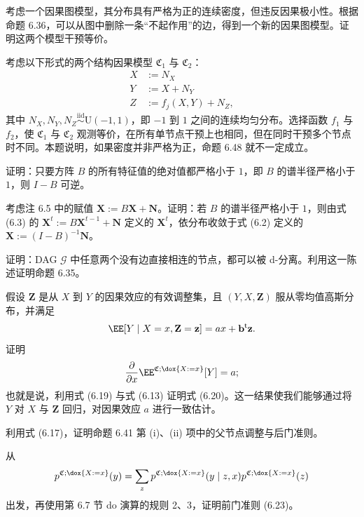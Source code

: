 \begin{problem}[因果极小性]
考虑一个因果图模型，其分布具有严格为正的连续密度，但违反因果极小性。根据命题 6.36，可以从图中删除一条“不起作用”的边，得到一个新的因果图模型。证明这两个模型干预等价。
\end{problem}

\begin{problem}[干预等价性]
考虑以下形式的两个结构因果模型 $\mathfrak C_1$ 与 $\mathfrak C_2$：
\[
 \begin{aligned}
 X&:=N_X\\
 Y&:=X+N_Y\\
 Z&:=f_j(X,Y)+N_Z,
 \end{aligned}
\]
其中 $N_X,N_Y,N_Z\overset{\mathrm{iid}}{\sim}\mathrm U(-1,1)$，即 $-1$ 到 $1$ 之间的连续均匀分布。选择函数 $f_1$ 与 $f_2$，使 $\mathfrak C_1$ 与 $\mathfrak C_2$ 观测等价，在所有单节点干预上也相同，但在同时干预多个节点时不同。本题说明，如果密度并非严格为正，命题 6.48 就不一定成立。
\end{problem}

\begin{problem}[有环结构因果模型]
证明：只要方阵 $B$ 的所有特征值的绝对值都严格小于 $1$，即 $B$ 的谱半径严格小于 $1$，则 $I-B$ 可逆。
\end{problem}

\begin{problem}[有环结构因果模型]
考虑注 6.5 中的赋值 $\mathbf X:=B\mathbf X+\mathbf N$。证明：若 $B$ 的谱半径严格小于 $1$，则由式 (6.3) 的 $\mathbf X^t:=B\mathbf X^{t-1}+\mathbf N$ 定义的 $\mathbf X^t$，依分布收敛于式 (6.2) 定义的 $\mathbf X:=(I-B)^{-1}\mathbf N$。
\end{problem}

\begin{problem}[d-分离]
证明：DAG $\mathcal G$ 中任意两个没有边直接相连的节点，都可以被 d-分离。利用这一陈述证明命题 6.35。
\end{problem}

\begin{problem}[协变量调整]
假设 $\mathbf Z$ 是从 $X$ 到 $Y$ 的因果效应的有效调整集，且 $(Y,X,\mathbf Z)$ 服从零均值高斯分布，并满足
\[
 \EE[Y\mid X=x,\mathbf Z=\mathbf z]=ax+\mathbf b^{\mathsf t}\mathbf z.
\]
证明
\[
 \frac{\partial}{\partial x}\EE^{\mathfrak C;\dox{X:=x}}[Y]=a;
\]
也就是说，利用式 (6.19) 与式 (6.13) 证明式 (6.20)。这一结果使我们能够通过将 $Y$ 对 $X$ 与 $\mathbf Z$ 回归，对因果效应 $a$ 进行一致估计。
\end{problem}

\begin{problem}[协变量调整]
利用式 (6.17)，证明命题 6.41 第 (i)、(ii) 项中的父节点调整与后门准则。
\end{problem}

\begin{problem}[协变量调整]
从
\[
 p^{\mathfrak C;\dox{X:=x}}(y)
 =\sum_zp^{\mathfrak C;\dox{X:=x}}(y\mid z,x)
 p^{\mathfrak C;\dox{X:=x}}(z)
\]
出发，再使用第 6.7 节 do 演算的规则 2、3，证明前门准则 (6.23)。
\end{problem}
